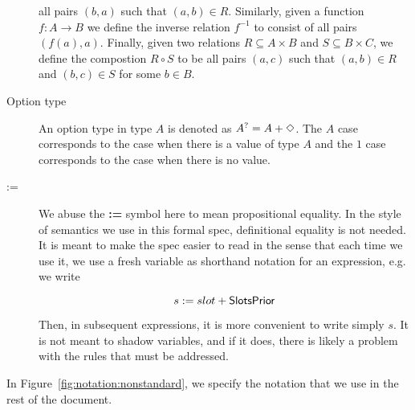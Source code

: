 \begin{description}
    all pairs $(b, a)$ such that $(a, b)\in R$. Similarly, given a function $f:A\to B$ we
    define the inverse relation $f^{-1}$ to consist of all pairs $(f(a), a)$.
    Finally, given two relations $R\subseteq A\times B$ and $S\subseteq B\times C$,
    we define the compostion $R\circ S$ to be all pairs $(a, c)$ such that
    $(a, b)\in R$ and $(b, c)\in S$ for some $b\in B$.
  \item[Option type] An option type in type $A$ is denoted as $A^? = A + \Diamond$. The
    $A$ case corresponds to the case when there is a value of type $A$ and the $1$
    case corresponds to the case when there is no value.
  \item[:=] We abuse the \textbf{:=} symbol here to mean propositional equality. In the
  style of semantics we use in this formal spec, definitional equality is not needed.
  It is meant to make the spec easier to read in the sense that each time we use it,
  we use a fresh variable as shorthand notation for an expression, e.g. we write

  \[s := slot + \mathsf{SlotsPrior}\]

  Then, in subsequent expressions, it is more convenient to write simply $s$.
  It is not meant to shadow variables, and if it does, there is likely a problem with the
  rules that must be addressed.
\end{description}


In Figure~\ref{fig:notation:nonstandard}, we specify the notation that we use in
the rest of the document.

